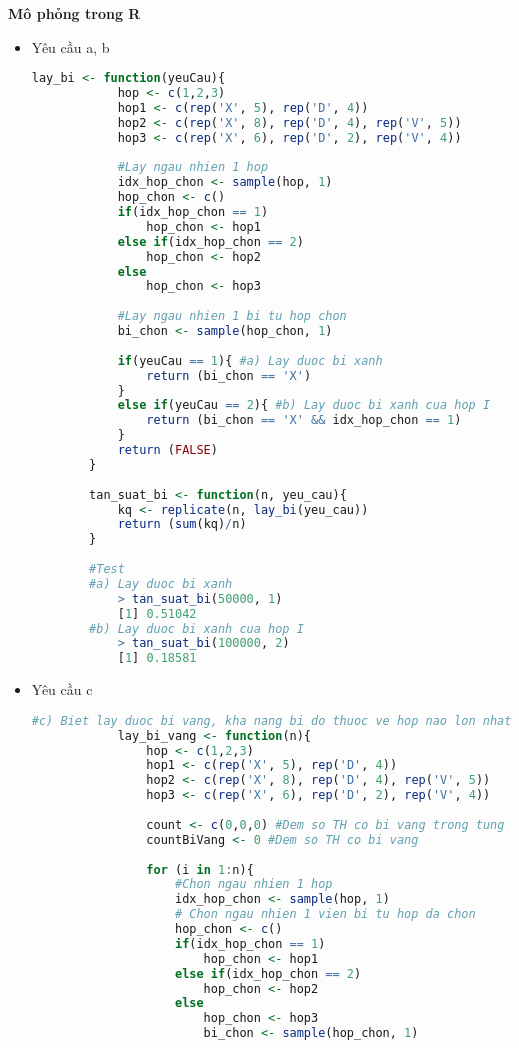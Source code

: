 \documentclass[a4paper,12pt]{article}
\begin{document}
	{\large\textbf{Mô phỏng trong R}} \\
	\begin{itemize}
		\item Yêu cầu a, b \\
	
		\begin{lstlisting}[language=R]
		lay_bi <- function(yeuCau){
			hop <- c(1,2,3)
			hop1 <- c(rep('X', 5), rep('D', 4))
			hop2 <- c(rep('X', 8), rep('D', 4), rep('V', 5))
			hop3 <- c(rep('X', 6), rep('D', 2), rep('V', 4))
			
			#Lay ngau nhien 1 hop
			idx_hop_chon <- sample(hop, 1)
			hop_chon <- c()
			if(idx_hop_chon == 1)
				hop_chon <- hop1
			else if(idx_hop_chon == 2)
				hop_chon <- hop2
			else
				hop_chon <- hop3
				
			#Lay ngau nhien 1 bi tu hop chon
			bi_chon <- sample(hop_chon, 1)
		
			if(yeuCau == 1){ #a) Lay duoc bi xanh
				return (bi_chon == 'X')
			}
			else if(yeuCau == 2){ #b) Lay duoc bi xanh cua hop I
				return (bi_chon == 'X' && idx_hop_chon == 1)
			}
			return (FALSE)
		}
		
		tan_suat_bi <- function(n, yeu_cau){
			kq <- replicate(n, lay_bi(yeu_cau))
			return (sum(kq)/n)
		}
		
		#Test
		#a) Lay duoc bi xanh
			> tan_suat_bi(50000, 1)
			[1] 0.51042
		#b) Lay duoc bi xanh cua hop I
			> tan_suat_bi(100000, 2)
			[1] 0.18581
		\end{lstlisting}
		
		\item Yêu cầu c \\
		\begin{lstlisting}[language=R]
			#c) Biet lay duoc bi vang, kha nang bi do thuoc ve hop nao lon nhat?
			lay_bi_vang <- function(n){
				hop <- c(1,2,3)
				hop1 <- c(rep('X', 5), rep('D', 4))
				hop2 <- c(rep('X', 8), rep('D', 4), rep('V', 5))
				hop3 <- c(rep('X', 6), rep('D', 2), rep('V', 4))
			
				count <- c(0,0,0) #Dem so TH co bi vang trong tung hop
				countBiVang <- 0 #Dem so TH co bi vang 
			
				for (i in 1:n){
					#Chon ngau nhien 1 hop
					idx_hop_chon <- sample(hop, 1)
					# Chon ngau nhien 1 vien bi tu hop da chon
					hop_chon <- c()
					if(idx_hop_chon == 1)
						hop_chon <- hop1
					else if(idx_hop_chon == 2)
						hop_chon <- hop2
					else
						hop_chon <- hop3
						bi_chon <- sample(hop_chon, 1)
			

\end{lstlisting}
\end{itemize}
\end{document}

